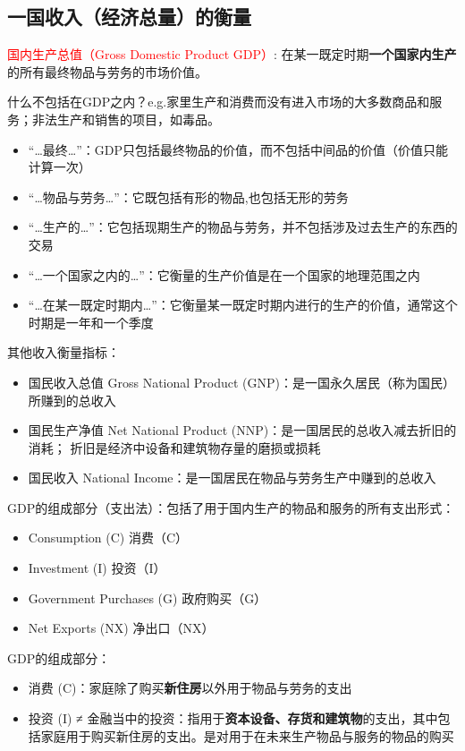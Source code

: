 \documentclass[12pt, a4paper]{article}
\begin{document}
\subsection{一国收入（经济总量）的衡量}
\textcolor{red}{国内生产总值（Gross Domestic Product GDP）}: 在某一既定时期\textbf{一个国家内生产}的所有最终物品与劳务的市场价值。

什么不包括在GDP之内？e.g.家里生产和消费而没有进入市场的大多数商品和服务；非法生产和销售的项目，如毒品。
\begin{itemize}
  \item “…最终…”：GDP只包括最终物品的价值，而不包括中间品的价值（价值只能计算一次）
  \item “…物品与劳务…”：它既包括有形的物品,也包括无形的劳务
  \item “…生产的…”：它包括现期生产的物品与劳务，并不包括涉及过去生产的东西的交易
  \item “…一个国家之内的…”：它衡量的生产价值是在一个国家的地理范围之内
  \item “…在某一既定时期内…”：它衡量某一既定时期内进行的生产的价值，通常这个时期是一年和一个季度
\end{itemize}

其他收入衡量指标：
\begin{itemize}
  \item 国民收入总值 Gross National Product (GNP)：是一国永久居民（称为国民）所赚到的总收入 
  \item 国民生产净值 Net National Product (NNP)：是一国居民的总收入减去折旧的消耗； 折旧是经济中设备和建筑物存量的磨损或损耗
  \item 国民收入 National Income：是一国居民在物品与劳务生产中赚到的总收入
\end{itemize}

GDP的组成部分（支出法）：包括了用于国内生产的物品和服务的所有支出形式：
\begin{itemize}
  \item Consumption (C) 消费（C）
  \item Investment (I) 投资（I）
  \item Government Purchases (G) 政府购买（G）
  \item Net Exports (NX) 净出口（NX）
\end{itemize}

GDP的组成部分：
\begin{itemize}
  \item 消费 (C)：家庭除了购买\textbf{新住房}以外用于物品与劳务的支出
  \item 投资 (I) ≠ 金融当中的投资：指用于\textbf{资本设备、存货和建筑物}的支出，其中包括家庭用于购买新住房的支出。是对用于在未来生产物品与服务的物品的购买
\end{itemize}
\end{document}
